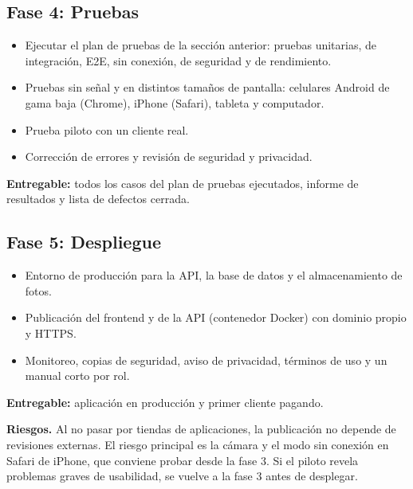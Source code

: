 \documentclass[11pt,a4paper]{article}
\begin{document}
\subsection{Fase 4: Pruebas}
\begin{itemize}[leftmargin=1.2em]
  \item Ejecutar el plan de pruebas de la sección anterior: pruebas unitarias, de integración, E2E, sin conexión, de seguridad y de rendimiento.
  \item Pruebas sin señal y en distintos tamaños de pantalla: celulares Android de gama baja (Chrome), iPhone (Safari), tableta y computador.
  \item Prueba piloto con un cliente real.
  \item Corrección de errores y revisión de seguridad y privacidad.
\end{itemize}
\textbf{Entregable:} todos los casos del plan de pruebas ejecutados, informe de resultados y lista de defectos cerrada.

\subsection{Fase 5: Despliegue}
\begin{itemize}[leftmargin=1.2em]
  \item Entorno de producción para la API, la base de datos y el almacenamiento de fotos.
  \item Publicación del frontend y de la API (contenedor Docker) con dominio propio y HTTPS.
  \item Monitoreo, copias de seguridad, aviso de privacidad, términos de uso y un manual corto por rol.
\end{itemize}
\textbf{Entregable:} aplicación en producción y primer cliente pagando.

\textbf{Riesgos.} Al no pasar por tiendas de aplicaciones, la publicación no depende de revisiones externas. El riesgo principal es la cámara y el modo sin conexión en Safari de iPhone, que conviene probar desde la fase 3. Si el piloto revela problemas graves de usabilidad, se vuelve a la fase 3 antes de desplegar.
\end{document}
